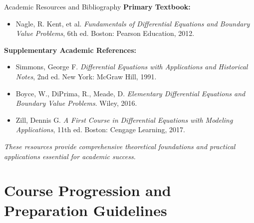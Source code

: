 \documentclass[10pt,aspectratio=169]{beamer}
\newcommand{\concept}[1]{\textbf{#1}}
\newcommand{\emphasis}[1]{\textit{#1}}
\begin{document}
\begin{frame}{Academic Resources and Bibliography}
    \concept{Primary Textbook:}
    \begin{itemize}
        \item Nagle, R. Kent, et al. \textit{Fundamentals of Differential Equations and Boundary Value Problems}, 6th ed. Boston: Pearson Education, 2012.
    \end{itemize}
    
    \vspace{0.3cm}
    
    \concept{Supplementary Academic References:}
    \begin{itemize}
        \item Simmons, George F. \textit{Differential Equations with Applications and Historical Notes}, 2nd ed. New York: McGraw Hill, 1991.
        \item Boyce, W., DiPrima, R., Meade, D. \textit{Elementary Differential Equations and Boundary Value Problems}. Wiley, 2016.
        \item Zill, Dennis G. \textit{A First Course in Differential Equations with Modeling Applications}, 11th ed. Boston: Cengage Learning, 2017.
    \end{itemize}
    
    \vspace{0.2cm}
    
    \emphasis{These resources provide comprehensive theoretical foundations and practical applications essential for academic success.}
\end{frame}

\section{Course Progression and Preparation Guidelines}
\end{document}
